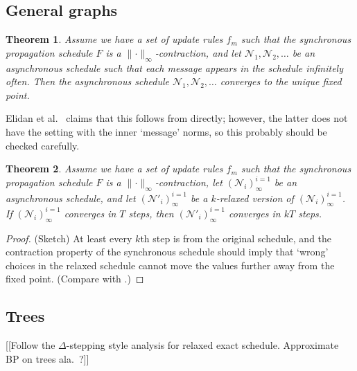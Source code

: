 \documentclass[11pt,a4paper]{article}
\newtheorem{theorem}{Theorem}
\theoremstyle{remark}
\newcommand{\N}{\mathcal{N}}
\newcommand{\norm}[1]{\lVert #1 \rVert}
\begin{document}
\subsection{General graphs}

\begin{theorem}
Assume we have a set of update rules $f_m$ such that the synchronous propagation schedule $F$ is a $\norm{\cdot}_\infty$-contraction, and let $\N_1, \N_2, \dotsc$ be an asynchronous schedule such that each message appears in the schedule infinitely often. Then the asynchronous schedule $\N_1, \N_2, \dotsc$ converges to the unique fixed point.
\end{theorem}

Elidan et al.~\cite{elidan2006residual} claims that this follows from \cite{Bertsekas1983} directly; however, the latter does not have the setting with the inner `message' norms, so this probably should be checked carefully.

\begin{theorem}
Assume we have a set of update rules $f_m$ such that the synchronous propagation schedule $F$ is a $\norm{\cdot}_\infty$-contraction, let $(\N_i)^{i = 1}_\infty$ be an asynchronous schedule, and let $(\N'_i)^{i = 1}_\infty$ be a $k$-relaxed version of $(\N_i)^{i = 1}_\infty$. If $(\N_i)^{i = 1}_\infty$ converges in $T$ steps, then $(\N'_i)^{i = 1}_\infty$ converges in $kT$ steps.
\end{theorem}

\begin{proof}
(Sketch) At least every $k$th step is from the original schedule, and the contraction property of the synchronous schedule should imply that `wrong' choices in the relaxed schedule cannot move the values further away from the fixed point. (Compare with \cite{elidan2006residual}.)
\end{proof}

\subsection{Trees}

[[Follow the $\Delta$-stepping style analysis for relaxed exact schedule. Approximate BP on trees ala.~\cite{pmlr-v5-gonzalez09a}?]]

\renewcommand{\doi}[1]{\href{http://dx.doi.org/#1}{\footnotesize\sf doi:\Doi{#1}}}



\end{document}
